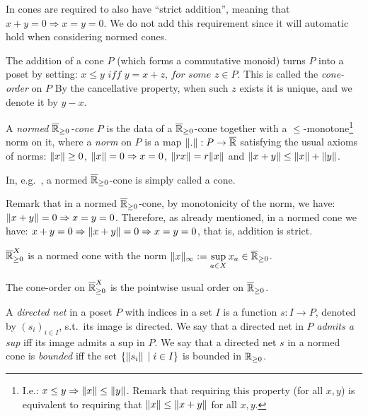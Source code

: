 In \cite{Selinger2004} cones are required to also have ``strict addition'', meaning that $x+y=0 \Rightarrow x=y=0$.
We do not add this requirement since it will automatic hold when considering normed cones.

\begin{remark}
 The addition of a cone $P$ (which forms a commutative monoid) turns $P$ into a poset by setting:
 $
  x \leq y \textit{ iff } y=x+z \textit{, for some }z\in P.
 $
 This is called the \emph{cone-order} on $P$
 By the cancellative property, when such $z$ exists it is unique, and we denote it by $y-x$.
\end{remark}

\begin{definition}
 A \emph{normed $\overline{\mathbb{R}}_{\geq 0}$-cone} $P$ is the data of a $\overline{\mathbb{R}}_{\geq 0}$-cone together with a $\leq$-monotone\footnote{I.e.: $x\leq y \Rightarrow \lVert x\rVert\leq \lVert y\rVert$. Remark that requiring this property (for all $x,y$) is equivalent to requiring that $\lVert x\rVert\leq \lVert x+y\rVert$ for all $x,y$.} norm on it, where a \emph{norm} on $P$ is a map $\lVert.\rVert:P\to \overline{\mathbb{R}}$ satisfying the usual axioms of norms:
 $\lVert x\rVert \geq 0$, $\lVert x\rVert = 0 \Rightarrow x=0$, $\lVert rx\rVert=r\lVert x\rVert$ and $\lVert x+y\rVert\leq \lVert x\rVert + \lVert y\rVert$.
\end{definition}

In, e.g.~\cite{EhrPagTas2018}, a normed $\overline{\mathbb{R}}_{\geq 0}$-cone is simply called a cone.

Remark that in a normed $\overline{\mathbb{R}}_{\geq 0}$-cone, by monotonicity of the norm, we have: $\lVert x+y\rVert=0 \Rightarrow x=y=0$.
Therefore, as already mentioned, in a normed cone we have: 
$x+y=0 \Rightarrow \lVert x+y\rVert=0 \Rightarrow x=y=0$, that is, addition is strict.

\begin{example}
 $\overline{\mathbb{R}}_{\geq 0}^X$ is a normed cone with the norm $\lVert x\rVert_\infty:=\sup\limits_{a\in X} x_a\in \overline{\mathbb{R}}_{\geq 0}$.
\end{example}

\begin{remark}
 The cone-order on $\overline{\mathbb{R}}_{\geq 0}^X$ is the pointwise usual order on $\overline{\mathbb{R}}_{\geq 0}$.
\end{remark}

A \emph{directed net} in a poset $P$ with indices in a set $I$ is a function $s:I\to P$, denoted by $(s_i)_{i\in I}$, s.t.\ its image is directed.
We say that a directed net in $P$ \emph{admits a sup} iff its image admits a sup in $P$.
We say that a directed net $s$ in a normed cone is \emph{bounded} iff the set $\{\lVert s_i\rVert\,\mid i\in I\}$ is bounded in $\mathbb{R}_{\geq 0}$.

